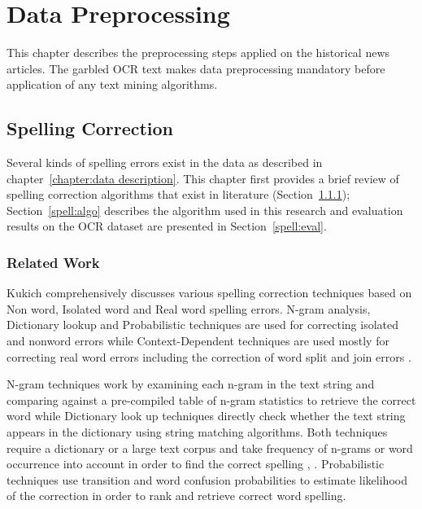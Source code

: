 \documentclass[letterpaper,11pt]{report}
\begin{document}
\chapter{Data Preprocessing}
\label{chapter:data preprocessing} 

 
This chapter describes the preprocessing steps applied on the historical news articles.
The garbled OCR text makes data preprocessing mandatory before application of any text mining algorithms. 

\section{Spelling Correction}

Several kinds of spelling errors exist in the data as described in chapter~\ref{chapter:data description}. This chapter first provides a brief review of spelling correction algorithms that exist in literature (Section~\ref{spell:rw}); Section~\ref{spell:algo} describes the algorithm used in this research and evaluation results on the OCR dataset are presented in Section~\ref{spell:eval}.



\subsection{Related Work}
\label{spell:rw}

Kukich\cite{kukich1992techniques} comprehensively discusses various spelling correction techniques based on Non word, Isolated word and Real word spelling errors. N-gram analysis, Dictionary lookup and Probabilistic techniques are used for correcting isolated and nonword errors while Context-Dependent techniques are used mostly for correcting real word errors including the correction of word split and join errors \cite{elmi1998spelling}.

 N-gram techniques work by examining each n-gram in the text string and comparing against a pre-compiled table of n-gram statistics to retrieve the correct word while Dictionary look up techniques directly check whether the text string appears in the dictionary using string matching algorithms. Both techniques require a dictionary or a large text corpus and take frequency of n-grams or word occurrence into account in order to find the correct spelling \cite{strohmaier2003lexical}, \cite{ringlstetter2007text}.
 Probabilistic techniques use transition and word confusion probabilities to estimate likelihood of the correction in order to rank and retrieve correct word spelling.
\end{document}
